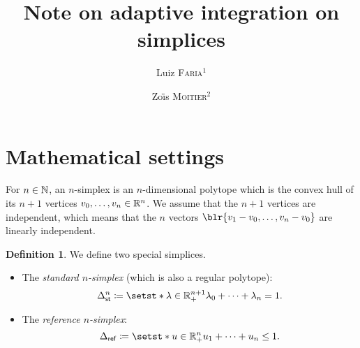\documentclass[english,12pt]{article}
\title{Note on adaptive integration on simplices}
\author{
    Luiz \textsc{Faria}\({}^1\)
    \and
    Zo{\"\i}s \textsc{Moitier}\({}^2\)
}
\date{\raggedright\footnotesize%
    \({^1}\)POEMS, CNRS, Inria, ENSTA Paris, Institut Polytechnique de Paris, 91120 Palaiseau, France.\\
    \({}^2\)IDEFIX, Inria, ENSTA Paris, Institut Polytechnique de Paris, 91120 Palaiseau, France.\\[1em]
    \large\Red{\textbf{\today}}
}
\numberwithin{equation}{section}
\DeclarePairedDelimiter{\blr}\lbrace\rbrace%
\theoremstyle{definition}
\newtheorem{definition}{Definition}[section]
\theoremstyle{plain}
\theoremstyle{remark}
\begin{document}
\maketitle




\section{Mathematical settings}

For \( n  \in \mathbb{N} \), an \( n \)-simplex is an \( n \)-dimensional polytope which is the convex hull of its \( n+1 \) vertices \( v_0, \ldots, v_n \in \mathbb{R}^n \).
We assume that the \( n+1 \) vertices are independent, which means that the \( n \) vectors \( \blr{v_1 - v_0, \ldots, v_n - v_0} \) are linearly independent.

\begin{definition}
    We define two special simplices.
    \begin{itemize}
        \item The \emph{standard \( n \)-simplex} (which is also a regular polytope):
              \[
                  \Simplex_\St^n \coloneqq \setst*{\lambda \in \bbR_+^{n+1}}{\lambda_0 + \cdots + \lambda_n = 1}.
              \]

        \item The \emph{reference \( n \)-simplex}:
              \[
                  \Simplex_\Rf \coloneqq \setst*{u \in \bbR_+^n}{u_1 + \cdots + u_n \leq 1}.
              \]
    \end{itemize}
\end{definition}








\end{document}

